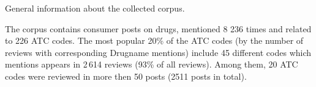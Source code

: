 \documentclass[a4paper,fleqn,longmktitle]{cas-dc}
\begin{document}
\begin{table*}
\centering
\caption{General information about the collected corpus.} \label{tab:info_collected_corpus}

\end{table*}




The corpus contains consumer posts on drugs, mentioned 8 236 times and related to 226 ATC codes.  The most popular 20\% of the ATC codes (by the number of reviews with corresponding Drugname mentions) include 45 different codes which mentions appears in 2\,614 reviews (93\% of all reviews). Among them, 20 ATC codes were reviewed in more then 50 posts (2511 posts in total).
\end{document}
